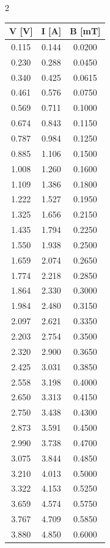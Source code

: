 \documentclass{article}
\begin{document}
\begin{multicols}{2}
    \begin{center}
\small
\begin{tabular}{ccc}
\hline
\textbf{V [V]} & \textbf{I [A]} & \textbf{B [mT]} \\
\hline
0.115 & 0.144 & 0.0200 \\
0.230 & 0.288 & 0.0450 \\
0.340 & 0.425 & 0.0615 \\
0.461 & 0.576 & 0.0750 \\
0.569 & 0.711 & 0.1000 \\
0.674 & 0.843 & 0.1150 \\
0.787 & 0.984 & 0.1250 \\
0.885 & 1.106 & 0.1500 \\
1.008 & 1.260 & 0.1600 \\
1.109 & 1.386 & 0.1800 \\
1.222 & 1.527 & 0.1950 \\
1.325 & 1.656 & 0.2150 \\
1.435 & 1.794 & 0.2250 \\
1.550 & 1.938 & 0.2500 \\
1.659 & 2.074 & 0.2650 \\
1.774 & 2.218 & 0.2850 \\
1.864 & 2.330 & 0.3000 \\
1.984 & 2.480 & 0.3150 \\
2.097 & 2.621 & 0.3350 \\
2.203 & 2.754 & 0.3500 \\
2.320 & 2.900 & 0.3650 \\
2.425 & 3.031 & 0.3850 \\
2.558 & 3.198 & 0.4000 \\
2.650 & 3.313 & 0.4150 \\
2.750 & 3.438 & 0.4300 \\
2.873 & 3.591 & 0.4500 \\
2.990 & 3.738 & 0.4700 \\
3.075 & 3.844 & 0.4850 \\
3.210 & 4.013 & 0.5000 \\
3.322 & 4.153 & 0.5250 \\
3.659 & 4.574 & 0.5750 \\
3.767 & 4.709 & 0.5850 \\
3.880 & 4.850 & 0.6000 \\
\hline
\end{tabular}

\end{center}



\end{multicols}
\end{document}
